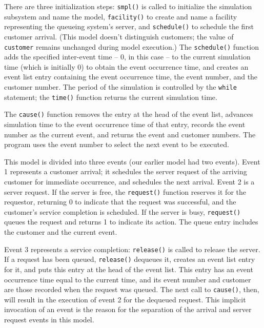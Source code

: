 There are three initialization steps: \texttt{smpl()} is called to initialize the
simulation subsystem and name the model, \texttt{facility()} to create and name a
facility representing the queueing system's server, and \texttt{schedule()} to
schedule the first customer arrival. (This model doesn't distinguish customers;
the value of \texttt{customer} remains unchanged during model execution.) The
\texttt{schedule()} function adds the specified inter-event time -- 0, in this
case -- to the current simulation time (which is initially 0) to obtain the event
occurrence time, and creates an event list entry containing the event occurrence
time, the event number, and the customer number. The period of the simulation is
controlled by the \texttt{while} statement; the \texttt{time()} function returns
the current simulation time.

The \texttt{cause()} function removes the entry at the head of the event list,
advances simulation time to the event occurrence time of that entry, records the
event number as the current event, and returns the event and customer numbers.
The program uses the event number to select the next event to be executed.

This model is divided into three events (our earlier model had two events).
Event 1 represents a customer arrival; it schedules the server request of the
arriving customer for immediate occurrence, and schedules the next arrival.
Event 2 is a server request. If the server is free, the \texttt{request()}
function reserves it for the requestor, returning 0 to indicate that the request
was successful, and the customer's service completion is scheduled. If the server
is busy, \texttt{request()} queues the request and returns 1 to indicate its
action. The queue entry includes the customer and the current event.

Event 3 represents a service completion: \texttt{release()} is called to release
the server. If a request has been queued, \texttt{release()} dequeues it, creates
an event list entry for it, and puts this entry at the head of the event list.
This entry has an event occurrence time equal to the current time, and its event
number and customer are those recorded when the request was queued. The next call
to \texttt{cause()}, then, will result in the execution of event 2 for the dequeued
request. This implicit invocation of an event is the reason for the separation of
the arrival and server request events in this model.

